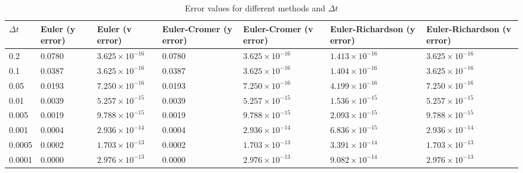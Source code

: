 \documentclass[11pt]{article}
\begin{document}
\begin{question}

	\begin{table}[h!]
		\centering
		\begin{tabularx}{\textwidth}{|X|X|X|X|X|X|X|}
		\hline
		$\Delta t$ & Euler (y error) & Euler (v error) & Euler-Cromer (y error) & Euler-Cromer (v error) & Euler-Richardson (y error) & Euler-Richardson (v error) \\
		\hline
		0.2    & 0.0780 & $3.625 \times 10^{-16}$ & 0.0780 & $3.625 \times 10^{-16}$ & $1.413 \times 10^{-16}$ & $3.625 \times 10^{-16}$ \\
		0.1    & 0.0387 & $3.625 \times 10^{-16}$ & 0.0387 & $3.625 \times 10^{-16}$ & $1.404 \times 10^{-16}$ & $3.625 \times 10^{-16}$ \\
		0.05   & 0.0193 & $7.250 \times 10^{-16}$ & 0.0193 & $7.250 \times 10^{-16}$ & $4.199 \times 10^{-16}$ & $7.250 \times 10^{-16}$ \\
		0.01   & 0.0039 & $5.257 \times 10^{-15}$ & 0.0039 & $5.257 \times 10^{-15}$ & $1.536 \times 10^{-15}$ & $5.257 \times 10^{-15}$ \\
		0.005  & 0.0019 & $9.788 \times 10^{-15}$ & 0.0019 & $9.788 \times 10^{-15}$ & $2.093 \times 10^{-15}$ & $9.788 \times 10^{-15}$ \\
		0.001  & 0.0004 & $2.936 \times 10^{-14}$ & 0.0004 & $2.936 \times 10^{-14}$ & $6.836 \times 10^{-15}$ & $2.936 \times 10^{-14}$ \\
		0.0005 & 0.0002 & $1.703 \times 10^{-13}$ & 0.0002 & $1.703 \times 10^{-13}$ & $3.391 \times 10^{-14}$ & $1.703 \times 10^{-13}$ \\
		0.0001 & 0.0000 & $2.976 \times 10^{-13}$ & 0.0000 & $2.976 \times 10^{-13}$ & $9.082 \times 10^{-14}$ & $2.976 \times 10^{-13}$ \\
		\hline
		\end{tabularx}
		\caption{Error values for different methods and $\Delta t$}
		\label{tab:error_values}
		\end{table}
\end{question}
\fi
\end{document}

